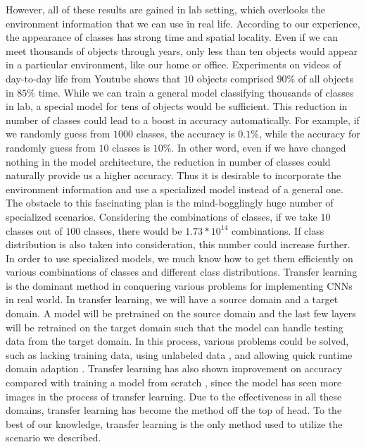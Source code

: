 \documentclass{article}
\begin{document}
However, all of these results are gained in lab setting, which overlooks the environment information that we can use in real life. According to our experience, the appearance of classes has strong time and spatial locality. Even if we can meet thousands of objects through years, only less than ten objects would appear in a particular environment, like our home or office. Experiments on videos of day-to-day life from Youtube \cite{shen2017fast} shows that $10$ objects comprised $90$\% of all objects in $85$\% time. While we can train a general model classifying thousands of classes in lab, a special model for tens of objects would be sufficient. This reduction in number of classes could lead to a boost in accuracy automatically. For example, if we randomly guess from $1000$ classes, the accuracy is $0.1\%$, while the accuracy for randomly guess from $10$ classes is $10\%$. In other word, even if we have changed nothing in the model architecture, the reduction in number of classes could naturally provide us a higher accuracy. Thus it is desirable to incorporate the environment information and use a specialized model instead of a general one. The obstacle to this fascinating plan is the mind-bogglingly huge number of specialized scenarios. Considering the combinations of classes, if we take $10$ classes out of $100$ classes, there would be $1.73*10^{14}$ combinations. If class distribution is also taken into consideration, this number could increase further. In order to use specialized models, we much know how to get them efficiently on various combinations of classes and different class distributions. 
Transfer learning is the dominant method in conquering various problems for implementing CNNs in real world. In transfer learning, we will have a source domain and a target domain. A model will be pretrained on the source domain and the last few layers will be retrained on the target domain such that the model can handle testing data from the target domain. In this process, various problems could be solved, such as lacking training data, using unlabeled data \cite{doersch2015unsupervised, noroozi2016unsupervised}, and allowing quick runtime domain adaption \cite{han2016mcdnn, shen2017fast}. Transfer learning has also shown improvement on accuracy compared with training a model from scratch \cite{oquab2014learning, yosinski2014transferable}, since the model has seen more images in the process of transfer learning. Due to the effectiveness in all these domains, transfer learning has become the method off the top of head. To the best of our knowledge, transfer learning is the only method used to utilize the scenario we described.
\end{document}
